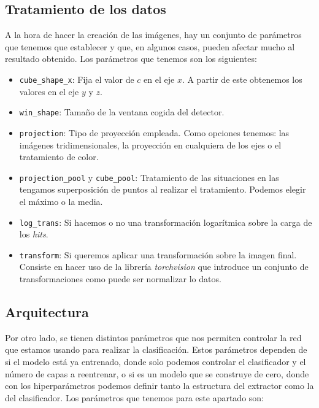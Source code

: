 \documentclass[a4paper,12pt,oneside,titlepage]{book}
\newcommand{\inline}[1]{\texttt{#1}}
\begin{document}
\subsection*{Tratamiento de los datos}

A la hora de hacer la creación de las imágenes, hay un conjunto de parámetros que tenemos que establecer y que, en algunos casos, pueden afectar mucho al resultado obtenido. Los parámetros que tenemos son los siguientes:

\begin{itemize}
  \item \inline{cube_shape_x}: Fija el valor de $c$ en el eje $x$. A partir de este obtenemos los valores en el eje $y$ y $z$.
  \item \inline{win_shape}: Tamaño de la ventana cogida del detector.
  \item \inline{projection}: Tipo de proyección empleada. Como opciones tenemos:  las imágenes tridimensionales, la proyección en cualquiera de los ejes o el tratamiento de color.
  \item \inline{projection_pool} y \inline{cube_pool}: Tratamiento de las situaciones en las tengamos superposición de puntos al realizar el tratamiento. Podemos elegir el máximo o la media.
  \item \inline{log_trans}: Si hacemos o no una transformación logarítmica sobre la carga de los \textit{hits}.
  \item \inline{transform}: Si queremos aplicar una transformación sobre la imagen final. Consiste en hacer uso de la librería \textit{torchvision} que introduce un conjunto de transformaciones como puede ser normalizar lo datos.
\end{itemize}

\subsection*{Arquitectura}

Por otro lado, se tienen distintos parámetros que nos permiten controlar la red que estamos usando para realizar la clasificación. Estos parámetros dependen de si el modelo está  ya entrenado, donde solo podemos controlar el clasificador y el número de capas a reentrenar, o si es un modelo que se construye de cero, donde con los hiperparámetros podemos definir tanto la estructura del extractor como la del clasificador. Los parámetros que tenemos para este apartado son:
\end{document}
